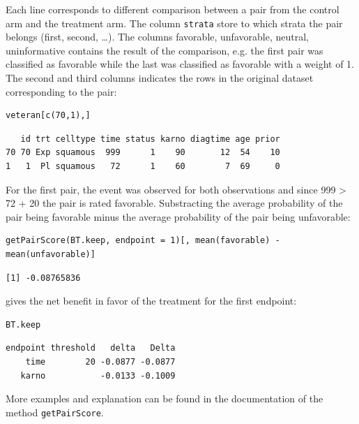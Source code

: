 \documentclass[12pt]{article}
\begin{document}
Each line corresponds to different comparison between a pair from the
control arm and the treatment arm. The column \texttt{strata} store to which
strata the pair belongs (first, second, \ldots{}). The columns favorable,
unfavorable, neutral, uninformative contains the result of the
comparison, e.g. the first pair was classified as favorable while the
last was classified as favorable with a weight of 1. The second and
third columns indicates the rows in the original dataset corresponding
to the pair:
\lstset{language=r,label= ,caption= ,captionpos=b,numbers=none}
\begin{lstlisting}
veteran[c(70,1),]
\end{lstlisting}

\begin{verbatim}
   id trt celltype time status karno diagtime age prior
70 70 Exp squamous  999      1    90       12  54    10
1   1  Pl squamous   72      1    60        7  69     0
\end{verbatim}



For the first pair, the event was observed for both observations and
since 999 > 72 + 20 the pair is rated favorable. Substracting the
average probability of the pair being favorable minus the average
probability of the pair being unfavorable:
\lstset{language=r,label= ,caption= ,captionpos=b,numbers=none}
\begin{lstlisting}
getPairScore(BT.keep, endpoint = 1)[, mean(favorable) - mean(unfavorable)]
\end{lstlisting}

\begin{verbatim}
[1] -0.08765836
\end{verbatim}


gives the net benefit in favor of the treatment for the first
endpoint:
\lstset{language=r,label= ,caption= ,captionpos=b,numbers=none}
\begin{lstlisting}
BT.keep
\end{lstlisting}

\begin{verbatim}
endpoint threshold   delta   Delta
    time        20 -0.0877 -0.0877
   karno           -0.0133 -0.1009
\end{verbatim}


More examples and explanation can be found in the documentation of
the method \texttt{getPairScore}.
\end{document}
